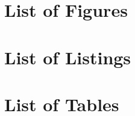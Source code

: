 \section{List of Figures}
\makeatletter
{}
\makeatother

\section{List of Listings}
\makeatletter
{}
\makeatother

\section{List of Tables}
\makeatletter
{}
\makeatother
